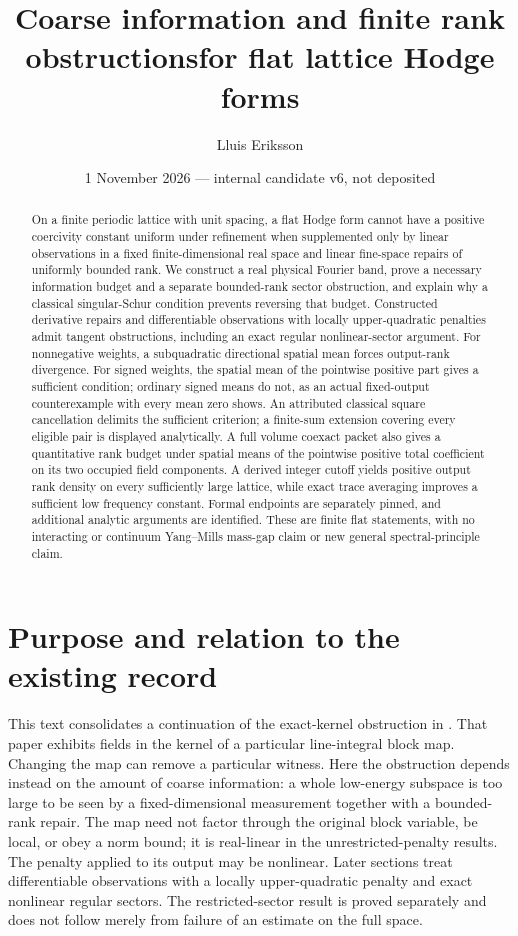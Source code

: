 \documentclass[11pt]{article}
\title{Coarse information and finite rank obstructions\newline for flat lattice Hodge forms}
\author{Lluis Eriksson}
\date{1 November 2026 --- internal candidate v6, not deposited}
\begin{document}
\maketitle
\begin{abstract}
On a finite periodic lattice with unit spacing, a flat Hodge form cannot
have a positive coercivity constant uniform under refinement when supplemented
only by linear observations in a fixed finite-dimensional real space and
linear fine-space repairs of uniformly bounded rank. We construct a real
physical Fourier band, prove a necessary information budget and a separate
bounded-rank sector obstruction, and explain why a classical singular-Schur
condition prevents reversing that budget. Constructed derivative repairs
and differentiable observations with locally upper-quadratic penalties
admit tangent obstructions, including an exact regular nonlinear-sector
argument. For nonnegative weights, a subquadratic directional spatial mean
forces output-rank divergence. For signed weights, the spatial mean of the
pointwise positive part gives a sufficient condition; ordinary signed means
do not, as an actual fixed-output counterexample with every mean zero shows.
An attributed classical square cancellation delimits the sufficient criterion;
a finite-sum extension covering every eligible pair is displayed analytically.
A full volume coexact packet also gives a quantitative rank budget under
spatial means of the pointwise positive total coefficient on its two occupied
field components. A derived integer cutoff yields positive output rank density
on every sufficiently large lattice, while exact trace averaging improves a
sufficient low frequency constant. Formal endpoints are separately pinned, and additional analytic arguments
are identified. These are finite flat statements, with no interacting or
continuum Yang--Mills mass-gap claim or new general spectral-principle claim.
\end{abstract}

\section{Purpose and relation to the existing record}
This text consolidates a continuation of the exact-kernel obstruction in
\cite{eriksson}. That paper exhibits fields in the kernel of a particular
line-integral block map. Changing the map can remove a particular witness.
Here the obstruction depends instead on the amount of coarse information:
a whole low-energy subspace is too large to be seen by a fixed-dimensional
measurement together with a bounded-rank repair. The map need not factor
through the original block variable, be local, or obey a norm bound; it is
real-linear in the unrestricted-penalty results. The penalty applied to its output may be nonlinear. Later sections treat differentiable observations with a locally upper-quadratic penalty and exact nonlinear regular sectors.
The restricted-sector result is proved separately and does not follow merely
from failure of an estimate on the full space.
\end{document}
